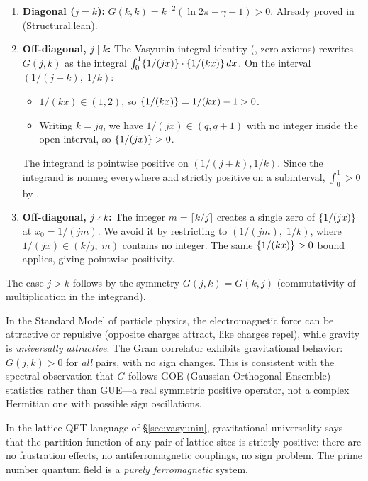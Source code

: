 \begin{enumerate}
  \item \textbf{Diagonal ($j = k$):} $G(k,k) = k^{-2}(\ln 2\pi - \gamma - 1) > 0$.
    Already proved in 
    (Structural.lean).

  \item \textbf{Off-diagonal, $j \mid k$:} The Vasyunin integral identity
    (, zero axioms) rewrites
    $G(j,k)$ as the integral $\int_0^1 \{1/(jx)\} \cdot
    \{1/(kx)\}\,dx$. On the interval $(1/(j+k),\; 1/k)$:
    \begin{itemize}
      \item $1/(kx) \in (1,2)$, so $\{1/(kx)\} = 1/(kx) - 1 > 0$.
      \item Writing $k = jq$, we have $1/(jx) \in (q, q+1)$
        with no integer inside the open interval, so
        $\{1/(jx)\} > 0$.
    \end{itemize}
    The integrand is pointwise positive on $(1/(j+k), 1/k)$.
    Since the integrand is nonneg everywhere and strictly positive
    on a subinterval, $\int_0^1 > 0$ by
    .

  \item \textbf{Off-diagonal, $j \nmid k$:} The integer
    $m = \lceil k/j \rceil$ creates a single zero of
    $\{1/(jx)\}$ at $x_0 = 1/(jm)$. We avoid it by restricting
    to $( 1/(jm),\; 1/k )$, where $1/(jx) \in (k/j,\; m)$ contains
    no integer. The same $\{1/(kx)\} > 0$ bound applies,
    giving pointwise positivity.
\end{enumerate}

The case $j > k$ follows by the symmetry $G(j,k) = G(k,j)$
(commutativity of multiplication in the integrand).

\begin{correspondence}
In the Standard Model of particle physics, the electromagnetic
force can be attractive or repulsive (opposite charges attract,
like charges repel), while gravity is \emph{universally attractive}.
The Gram correlator exhibits gravitational behavior: $G(j,k) > 0$
for \emph{all} pairs, with no sign changes. This is consistent with
the spectral observation that $G$ follows GOE (Gaussian Orthogonal
Ensemble) statistics rather than GUE---a real symmetric positive
operator, not a complex Hermitian one with possible sign oscillations.

In the lattice QFT language of \S\ref{sec:vasyunin}, gravitational
universality says that the partition function of any pair of
lattice sites is strictly positive: there are no frustration effects,
no antiferromagnetic couplings, no sign problem. The prime number
quantum field is a \emph{purely ferromagnetic} system.
\end{correspondence}

